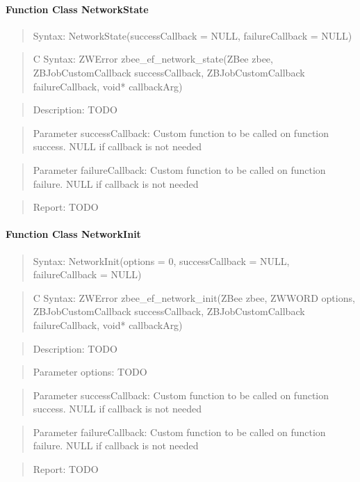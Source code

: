 \paragraph{Function Class NetworkState}
\begin{quote}Syntax: NetworkState(successCallback = NULL, failureCallback = NULL)\end{quote}
\begin{quote}C Syntax: ZWError zbee\_ef\_network\_state(ZBee zbee, ZBJobCustomCallback successCallback, ZBJobCustomCallback failureCallback, void* callbackArg)\end{quote}
\begin{quote}Description: TODO\end{quote}
\begin{quote}Parameter successCallback: Custom function to be called on function success. NULL if callback is not needed\end{quote}
\begin{quote}Parameter failureCallback: Custom function to be called on function failure. NULL if callback is not needed\end{quote}
\begin{quote}Report: TODO\end{quote}

\paragraph{Function Class NetworkInit}
\begin{quote}Syntax: NetworkInit(options = 0, successCallback = NULL, failureCallback = NULL)\end{quote}
\begin{quote}C Syntax: ZWError zbee\_ef\_network\_init(ZBee zbee, ZWWORD options, ZBJobCustomCallback successCallback, ZBJobCustomCallback failureCallback, void* callbackArg)\end{quote}
\begin{quote}Description: TODO\end{quote}
\begin{quote}Parameter options: TODO\end{quote}
\begin{quote}Parameter successCallback: Custom function to be called on function success. NULL if callback is not needed\end{quote}
\begin{quote}Parameter failureCallback: Custom function to be called on function failure. NULL if callback is not needed\end{quote}
\begin{quote}Report: TODO\end{quote}

